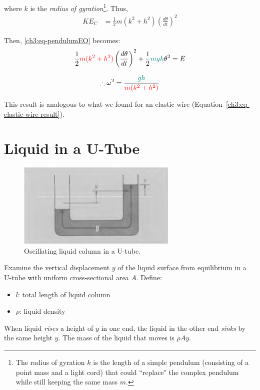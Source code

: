 where $k$ is the \emph{radius of gyration}\footnote{The radius of gyration $k$ is the length of a simple pendulum (consisting of a point mass and a light cord) that could ``replace" the complex pendulum while still keeping the same mass $m$.}. Thus,
\begin{align*}
	KE_C %
	&= \frac{1}{2} m(k^2 + h^2 ) \left( \frac{d\theta}{dt} \right)^2
\end{align*}

Then, \eqref{ch3:eq-pendulumEO} becomes:
\[ \frac{1}{2} \textcolor{red}{m(k^2+h^2)} \left( \frac{d\theta}{dt} \right)^2  + \frac{1}{2} \textcolor{teal}{mgh}\theta^2 = E \]

\begin{equation*}
	\therefore \omega^2 = \frac{\textcolor{teal}{gh}}{\textcolor{red}{m(k^2+h^2)}}
\end{equation*}

This result is analogous to what we found for an elastic wire (Equation~\ref{ch3:eq-elastic-wire-result}).

\section{Liquid in a U-Tube} \label{ch3:sec-uTube}

\begin{figure}
	\centering
	\includegraphics[scale=0.8]{phys232/Ch3-utube.png}
	\caption{Oscillating liquid column in a U-tube.}
	\label{ch3:fig-utube}
\end{figure}

Examine the vertical displacement $y$ of the liquid surface from equilibrium in a U-tube with uniform cross-sectional area $A$. Define:
\begin{itemize}
	\item $l$: total length of liquid column
	\item $\rho$: liquid density
\end{itemize}

When liquid \textit{rises} a height of $y$ in one end, the liquid in the other end \textit{sinks} by the same height $y$. The mass of the liquid that moves is $\rho Ay$. 

